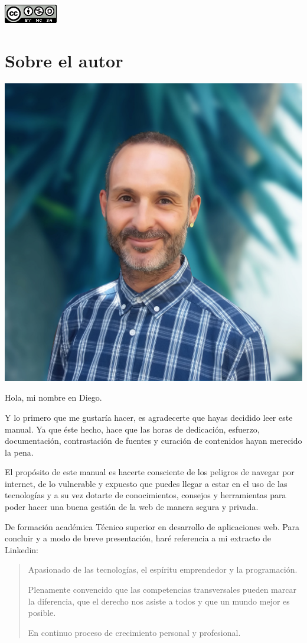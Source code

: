 \documentclass[
  spanish,
  a4paper,
  openany]{book}
\begin{document}
\begin{flushleft}\includegraphics{images/by-nc-sa-88x31} \end{flushleft}

\hypertarget{autor}{%
\chapter*{Sobre el autor}\label{autor}}

\begin{flushleft}\includegraphics[width=0.25\linewidth]{images/diego-chiquero-2020-profile} \end{flushleft}

Hola, mi nombre en Diego.

Y lo primero que me gustaría hacer, es agradecerte que hayas decidido leer este manual. Ya que éste hecho, hace que las horas de dedicación, esfuerzo, documentación, contrastación de fuentes y curación de contenidos hayan merecido la pena.

El propósito de este manual es hacerte consciente de los peligros de navegar por internet, de lo vulnerable y expuesto que puedes llegar a estar en el uso de las tecnologías y a su vez dotarte de conocimientos, consejos y herramientas para poder hacer una buena gestión de la web de manera segura y privada.

De formación académica Técnico superior en desarrollo de aplicaciones web.
Para concluir y a modo de breve presentación, haré referencia a mi extracto de Linkedin:

\begin{quote}
Apasionado de las tecnologías, el espíritu emprendedor y la programación.

Plenamente convencido que las competencias transversales pueden marcar la diferencia, que el derecho nos asiste a todos y que un mundo mejor es posible.

En continuo proceso de crecimiento personal y profesional.
\end{quote}
\end{document}
